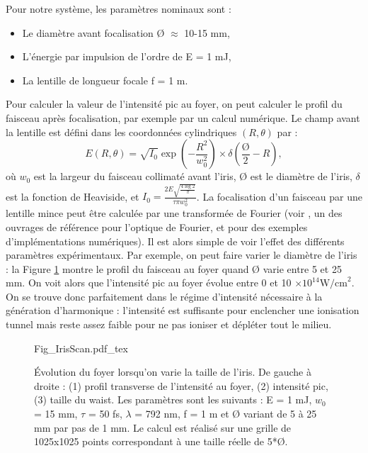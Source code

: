 Pour notre système, les paramètres nominaux sont :
\begin{itemize}
\item Le diamètre avant focalisation \O{} $\approx$ 10-15 mm,
\item L'énergie par impulsion de l'ordre de E = 1 mJ,
\item La lentille de longueur focale f = 1 m. \\
\end{itemize}
Pour calculer la valeur de l'intensité pic au foyer, on peut calculer le profil du faisceau après focalisation, par exemple par un calcul numérique. Le champ avant la lentille est défini dans les coordonnées cylindriques $(R,\theta)$ par :
\begin{equation*}
E(R,\theta) = \sqrt{I_0} \exp{\left(-\frac{R^2}{w_0^2}\right)}\times\delta(\frac{\mbox{\O}}{2}-R),
\end{equation*}
où $w_0$ est la largeur du faisceau collimaté avant l'iris, \O{}  est le diamètre de l'iris, $\delta$ est la fonction de Heaviside, et $I_0 = \frac{2E\sqrt{\frac{4\log{2}}{\pi}}}{\tau\pi w_0^2}$.
La focalisation d'un faisceau par une lentille mince peut être calculée par une transformée de Fourier (voir , un des ouvrages de référence pour l'optique de Fourier, et  pour des exemples d'implémentations numériques). Il est alors simple de voir l'effet des différents paramètres expérimentaux. Par exemple, on peut faire varier le diamètre de l'iris : la Figure \ref{Fig:IrisScan} montre le profil du faisceau au foyer quand \O{} varie entre 5 et 25 mm. On voit alors que l'intensité pic au foyer évolue entre 0 et 10 $\times 10^{14} \mbox{W/cm}^2$. On se trouve donc parfaitement dans le régime d'intensité nécessaire à la génération d'harmonique : l'intensité est suffisante pour enclencher une ionisation tunnel mais reste assez faible pour ne pas ioniser et dépléter tout le milieu.

\begin{figure}[!ht]
\centering
\def\svgwidth{\columnwidth}
{Fig_IrisScan.pdf_tex}
\caption{\'{E}volution du foyer lorsqu'on varie la taille de l'iris. De gauche à droite : (1) profil transverse de l'intensité au foyer, (2) intensité pic, (3) taille du waist. Les paramètres sont les suivants : E = 1 mJ, $w_0$ = 15 mm, $\tau$ = 50 fs, $\lambda$ = 792 nm, f = 1 m et \O{} variant de 5 à 25 mm par pas de 1 mm. Le calcul est réalisé sur une grille de 1025x1025 points correspondant à une taille réelle de 5*\O{}.}
\label{Fig:IrisScan}
\end{figure}

